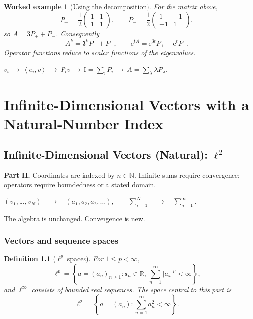 \documentclass[11pt,a5paper,oneside,openany]{scrreprt}
\theoremstyle{notes}
\theoremstyle{definitions}
\newtheorem{definition}[theorem]{Definition}
\newtheorem{example}[theorem]{Worked example}
\newcommand{\R}{\mathbb{R}}
\newcommand{\N}{\mathbb{N}}
\newcommand{\ip}[2]{\left\langle #1,#2\right\rangle}
\newcommand{\Id}{\mathrm{I}}
\newcommand{\e}{\mathrm{e}}
\begin{document}
\begin{example}[Using the decomposition]
For the matrix above,
\[
 P_+=\frac12\begin{pmatrix}1&1\\1&1\end{pmatrix},
 \qquad
 P_-=\frac12\begin{pmatrix}1&-1\\-1&1\end{pmatrix},
\]
so $A=3P_++P_-$.  Consequently
\[
 A^k=3^kP_++P_-,
 \qquad
 \e^{tA}=\e^{3t}P_++\e^tP_-.
\]
Operator functions reduce to scalar functions of the eigenvalues.
\end{example}

\begin{summarybox}
\centering
$\displaystyle
v_i\ \longrightarrow\ \ip{e_i}{v}\ \longrightarrow\ P_iv
\ \longrightarrow\
\Id=\sum_iP_i\ \longrightarrow\ A=\sum_\lambda\lambda P_\lambda.$
\end{summarybox}

\part{Infinite-Dimensional Vectors with a Natural-Number Index}
\chapter{Infinite-Dimensional Vectors (Natural): $\ell^2$}
\label{part:sequences}

\begin{summarybox}
\textbf{Part II.}  Coordinates are indexed by $n\in\N$.  Infinite sums require
convergence; operators require boundedness or a stated domain.
\end{summarybox}

\begin{bridge}
\centering
$\displaystyle
(v_1,\ldots,v_N)
\quad\longrightarrow\quad
(a_1,a_2,a_3,\ldots),
\qquad
\sum_{i=1}^{N}\quad\longrightarrow\quad\sum_{n=1}^{\infty}.$

The algebra is unchanged.  Convergence is new.
\end{bridge}

\section{Vectors and sequence spaces}

\begin{definition}[$\ell^p$ spaces]
For $1\le p<\infty$,
\[
 \ell^p=\left\{a=(a_n)_{n\ge1}:a_n\in\R,
 \ \sum_{n=1}^{\infty}|a_n|^p<\infty\right\},
\]
and $\ell^\infty$ consists of bounded real sequences.  The space central to
this part is
\[
 \boxed{\ell^2=\left\{a=(a_n):\sum_{n=1}^{\infty}a_n^2<\infty\right\}}.
\]
\end{definition}
\end{document}
